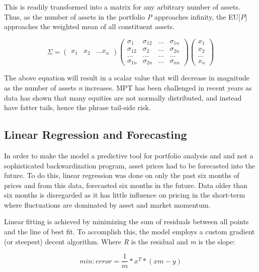 \documentclass[12pt]{article}
\begin{document}
This is readily transformed into a matrix for any arbitrary number of assets. Thus, as the number of assets in the portfolio \emph{P} approaches infinity, the EU[\emph{P}] approaches the weighted mean of all constituent assets. 

\begin{equation} 
	\Sigma = 
	\begin{pmatrix} x_{1} & x_{2} & ... x_{n} \end{pmatrix}
	\begin{pmatrix} \sigma_{1} & \sigma_{12} & ... & \sigma_{1n} \\ 
	\sigma_{12} & \sigma_{2} & ... & \sigma_{2n} \\
	... & ... & ... & ... \\
	\sigma_{1n} & \sigma_{2n} & ... & \sigma_{nn} \end{pmatrix}
	\begin{pmatrix} x_{1} \\ x_{2} \\ ... \\ x_{n} \end{pmatrix}
\end{equation}

\* The above equation will result in a scalar value that will decrease in magnitude as the number of assets \emph{n} increases. MPT has been challenged in recent years as data has shown that many equities are not normally distributed, and instead have fatter tails, hence the phrase tail-side risk.

\subsection{Linear Regression and Forecasting}
In order to make the model a predictive tool for portfolio analysis and and not a sophisticated backwardization program, asset prices had to be forecasted into the future. To do this, linear regression was done on only the past six months of prices and from this data, forecasted  six months in the future. Data older than six months is disregarded as it has little influence on pricing in the short-term where fluctuations are dominated by asset and market momentum. \

Linear fitting is achieved by minimizing the sum of residuals between all points and the line of best fit. To accomplish this, the model employs a custom gradient (or steepest) decent algorithm. Where \emph{R} is the residual and \emph{m} is the slope:

\begin{equation}
	min: error = \frac{1}{m} * x^{T} * (x m - y)
\end{equation}
\end{document}
